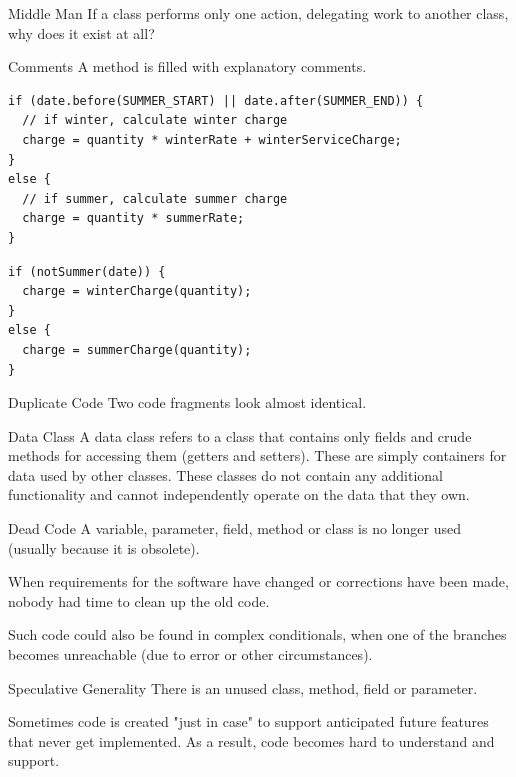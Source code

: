 \documentclass{beamer}
\begin{document}
\begin{frame}{Middle Man}
If a class performs only one action, delegating work to another class, why does
it exist at all?
\end{frame}

\begin{frame}[fragile]{Comments}
A method is filled with explanatory comments.
\begin{lstlisting}
if (date.before(SUMMER_START) || date.after(SUMMER_END)) {
  // if winter, calculate winter charge
  charge = quantity * winterRate + winterServiceCharge;
}
else {
  // if summer, calculate summer charge
  charge = quantity * summerRate;
}
\end{lstlisting}

\begin{lstlisting}
if (notSummer(date)) {
  charge = winterCharge(quantity);
}
else {
  charge = summerCharge(quantity);
}
\end{lstlisting}
\end{frame}

\begin{frame}{Duplicate Code}
Two code fragments look almost identical.
\end{frame}

\begin{frame}{Data Class}
A data class refers to a class that contains only fields and crude methods for
accessing them (getters and setters). These are simply containers for data used
by other classes. These classes do not contain any additional functionality and
cannot independently operate on the data that they own.  
\end{frame}

\begin{frame}{Dead Code}
A variable, parameter, field, method or class is no longer used (usually because
it is obsolete).

When requirements for the software have changed or corrections have been made,
nobody had time to clean up the old code. 

Such code could also be found in complex conditionals, when one of the branches
becomes unreachable (due to error or other circumstances). 
\end{frame}

\begin{frame}{Speculative Generality}
There is an unused class, method, field or parameter.

Sometimes code is created "just in case" to support anticipated future features
that never get implemented. As a result, code becomes hard to understand and
support.  
\end{frame}
\end{document}
